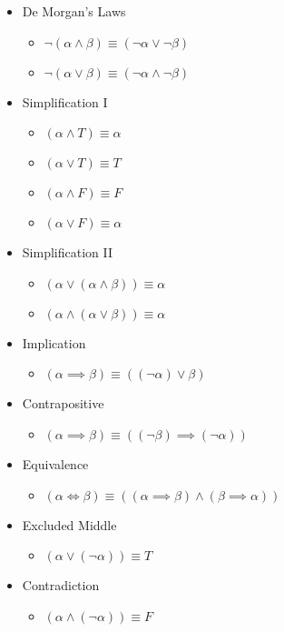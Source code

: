 \documentclass{article}
\begin{document}
\begin{itemize}
\item De Morgan's Laws 
\begin{itemize}
\item \(\neg (\alpha \wedge \beta) \equiv (\neg \alpha \vee \neg \beta)\)
\item \(\neg (\alpha \vee \beta) \equiv (\neg \alpha \wedge \neg \beta)\)
\end{itemize}

\item Simplification I
\begin{itemize}
\item \((\alpha \wedge T) \equiv \alpha\)
\item \((\alpha \vee T) \equiv T\)
\item \((\alpha \wedge F) \equiv F\)
\item \((\alpha \vee F) \equiv \alpha\)
\end{itemize}

\item Simplification II
\begin{itemize}
\item \((\alpha \vee (\alpha \wedge \beta)) \equiv \alpha\)
\item \((\alpha \wedge (\alpha \vee \beta)) \equiv \alpha\)
\end{itemize}

\item Implication 
\begin{itemize}
\item \((\alpha \implies \beta) \equiv ((\neg \alpha) \vee \beta)\)
\end{itemize}

\item Contrapositive 
\begin{itemize}
\item \((\alpha \implies \beta) \equiv ((\neg \beta) \implies (\neg \alpha))\)
\end{itemize}

\item Equivalence
\begin{itemize}
\item \((\alpha \iff \beta) \equiv ((\alpha \implies \beta) \wedge (\beta \implies \alpha))\)
\end{itemize}

\item Excluded Middle 
\begin{itemize}
\item \((\alpha \vee (\neg \alpha)) \equiv T\)
\end{itemize}

\item Contradiction 
\begin{itemize}
\item \((\alpha \wedge (\neg \alpha)) \equiv F \)
\end{itemize}
\end{itemize}
\end{document}
